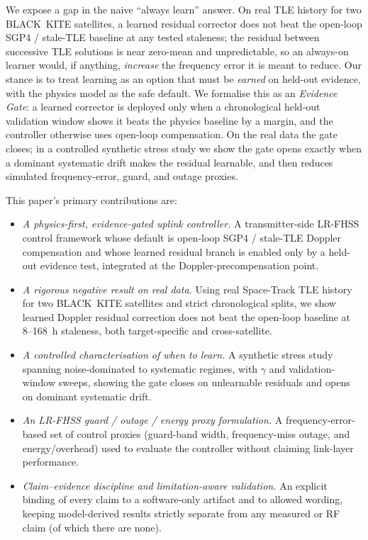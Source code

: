 \documentclass[conference]{IEEEtran}
\begin{document}
We expose a gap in the naive ``always learn'' answer. On real TLE history for two
BLACK~KITE satellites, a learned residual corrector does not beat the open-loop
SGP4 / stale-TLE baseline at any tested staleness; the residual between
successive TLE solutions is near zero-mean and unpredictable, so an always-on
learner would, if anything, \emph{increase} the frequency error it is meant to
reduce. Our stance is to treat learning as an option that must be \emph{earned}
on held-out evidence, with the physics model as the safe default. We formalise
this as an \emph{Evidence Gate}: a learned corrector is deployed only when a
chronological held-out validation window shows it beats the physics baseline by a
margin, and the controller otherwise uses open-loop compensation. On the real
data the gate closes; in a controlled synthetic stress study we show the gate
opens exactly when a dominant systematic drift makes the residual learnable, and
then reduces simulated frequency-error, guard, and outage proxies.

This paper's primary contributions are:
\begin{itemize}
  \item \emph{A physics-first, evidence-gated uplink controller.} A
  transmitter-side LR-FHSS control framework whose default is open-loop SGP4 /
  stale-TLE Doppler compensation and whose learned residual branch is enabled
  only by a held-out evidence test, integrated at the Doppler-precompensation
  point.
  \item \emph{A rigorous negative result on real data.} Using real Space-Track
  TLE history for two BLACK~KITE satellites and strict chronological splits, we
  show learned Doppler residual correction does not beat the open-loop baseline
  at 8--168~h staleness, both target-specific and cross-satellite.
  \item \emph{A controlled characterisation of when to learn.} A synthetic stress
  study spanning noise-dominated to systematic regimes, with $\gamma$ and
  validation-window sweeps, showing the gate closes on unlearnable residuals and
  opens on dominant systematic drift.
  \item \emph{An LR-FHSS guard / outage / energy proxy formulation.} A
  frequency-error-based set of control proxies (guard-band width, frequency-miss
  outage, and energy/overhead) used to evaluate the controller without claiming
  link-layer performance.
  \item \emph{Claim--evidence discipline and limitation-aware validation.} An
  explicit binding of every claim to a software-only artifact and to allowed
  wording, keeping model-derived results strictly separate from any measured or
  RF claim (of which there are none).
\end{itemize}
\end{document}
